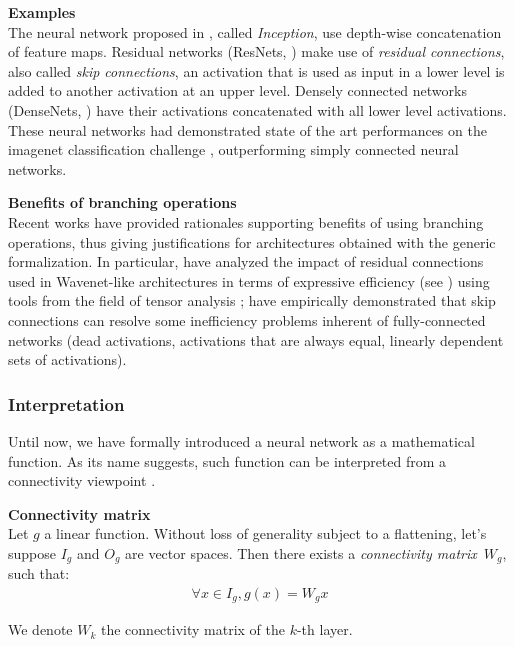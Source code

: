 \begin{remark}\textbf{Examples}\\
The neural network proposed in \citep{szegedy2015going}, called \emph{Inception}, use depth-wise concatenation of feature maps. Residual networks (ResNets, \cite{he2016deep}) make use of \emph{residual connections}, also called \emph{skip connections}, \ie an activation that is used as input in a lower level is added to another activation at an upper level. Densely connected networks (DenseNets, \cite{huang2017densely}) have their activations concatenated with all lower level activations. These neural networks had demonstrated state of the art performances on the imagenet classification challenge \citep{deng2009imagenet}, outperforming simply connected neural networks.
\label{rem:branching_ex}
\end{remark}

\begin{remark}\textbf{Benefits of branching operations}\\
Recent works have provided rationales supporting benefits of using branching operations, thus giving justifications for architectures obtained with the generic formalization. In particular, \citep{cohen2018boosting} have analyzed the impact of residual connections used in Wavenet-like architectures \citep{van2016wavenet} in terms of expressive efficiency (see ) using tools from the field of tensor analysis ; \citep{orhan2018skip} have empirically demonstrated that skip connections can resolve some inefficiency problems inherent of fully-connected networks (dead activations, activations that are always equal, linearly dependent sets of activations).

\end{remark}

\subsubsection{Interpretation}

Until now, we have formally introduced a neural network as a mathematical function. As its name suggests, such function can be interpreted from a connectivity viewpoint \citep{lecun-87}.

\begin{definition}\textbf{Connectivity matrix}\\
Let $g$ a linear function. Without loss of generality subject to a flattening, let's suppose $I_g$ and $O_g$ are vector spaces. Then there exists a \emph{connectivity matrix}~$W_g$, such that:
\begin{gather*}
\forall x \in I_g, g(x) = W_g x
\end{gather*}
\end{definition}
We denote $W_k$ the connectivity matrix of the $k$-th layer.

